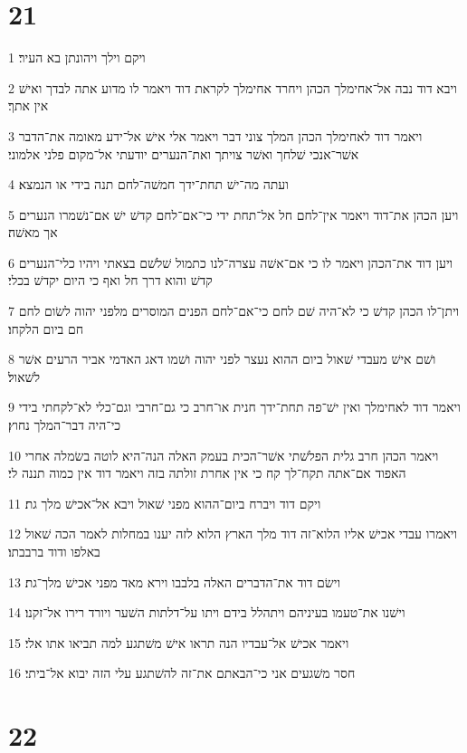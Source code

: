 \chapter{21}

\par 1 ויקם וילך ויהונתן בא העיר׃
\par 2 ויבא דוד נבה אל־אחימלך הכהן ויחרד אחימלך לקראת דוד ויאמר לו מדוע אתה לבדך ואישׁ אין אתך׃
\par 3 ויאמר דוד לאחימלך הכהן המלך צוני דבר ויאמר אלי אישׁ אל־ידע מאומה את־הדבר אשׁר־אנכי שׁלחך ואשׁר צויתך ואת־הנערים יודעתי אל־מקום פלני אלמוני׃
\par 4 ועתה מה־ישׁ תחת־ידך חמשׁה־לחם תנה בידי או הנמצא׃
\par 5 ויען הכהן את־דוד ויאמר אין־לחם חל אל־תחת ידי כי־אם־לחם קדשׁ ישׁ אם־נשׁמרו הנערים אך מאשׁה׃
\par 6 ויען דוד את־הכהן ויאמר לו כי אם־אשׁה עצרה־לנו כתמול שׁלשׁם בצאתי ויהיו כלי־הנערים קדשׁ והוא דרך חל ואף כי היום יקדשׁ בכלי׃
\par 7 ויתן־לו הכהן קדשׁ כי לא־היה שׁם לחם כי־אם־לחם הפנים המוסרים מלפני יהוה לשׂום לחם חם ביום הלקחו׃
\par 8 ושׁם אישׁ מעבדי שׁאול ביום ההוא נעצר לפני יהוה ושׁמו דאג האדמי אביר הרעים אשׁר לשׁאול׃
\par 9 ויאמר דוד לאחימלך ואין ישׁ־פה תחת־ידך חנית או־חרב כי גם־חרבי וגם־כלי לא־לקחתי בידי כי־היה דבר־המלך נחוץ׃
\par 10 ויאמר הכהן חרב גלית הפלשׁתי אשׁר־הכית בעמק האלה הנה־היא לוטה בשׂמלה אחרי האפוד אם־אתה תקח־לך קח כי אין אחרת זולתה בזה ויאמר דוד אין כמוה תננה לי׃
\par 11 ויקם דוד ויברח ביום־ההוא מפני שׁאול ויבא אל־אכישׁ מלך גת׃
\par 12 ויאמרו עבדי אכישׁ אליו הלוא־זה דוד מלך הארץ הלוא לזה יענו במחלות לאמר הכה שׁאול באלפו ודוד ברבבתו׃
\par 13 וישׂם דוד את־הדברים האלה בלבבו וירא מאד מפני אכישׁ מלך־גת׃
\par 14 וישׁנו את־טעמו בעיניהם ויתהלל בידם ויתו על־דלתות השׁער ויורד רירו אל־זקנו׃
\par 15 ויאמר אכישׁ אל־עבדיו הנה תראו אישׁ משׁתגע למה תביאו אתו אלי׃
\par 16 חסר משׁגעים אני כי־הבאתם את־זה להשׁתגע עלי הזה יבוא אל־ביתי׃

\chapter{22}

